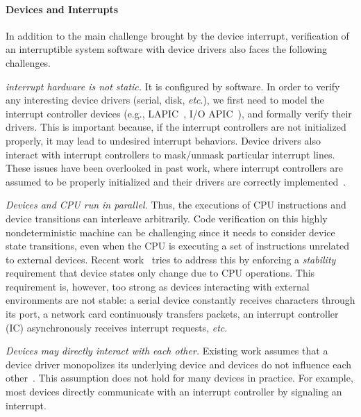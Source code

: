 \paragraph{Devices and Interrupts}

In addition to the main challenge brought by the device interrupt,
verification of an interruptible system software with device
drivers also faces the following challenges.

{\em interrupt hardware is not static.} It is configured by
software. In order to verify any interesting device drivers (serial,
disk, {\it etc}.), we first need to model the interrupt controller
devices (e.g., LAPIC~\cite{mps97}, I/O APIC~\cite{ioapicd96}), and
formally verify their drivers. This is important because, if the
interrupt controllers are not initialized properly, it may lead to
undesired interrupt behaviors. Device drivers also interact with
interrupt controllers to mask/unmask particular interrupt lines.
These issues have been overlooked in past work, where 
interrupt controllers are assumed to be properly initialized and
their drivers are correctly implemented~\cite{Alkassar:VSTTE08-225}.

{\em Devices and CPU run in parallel.} Thus, the executions of CPU
instructions and device transitions can interleave arbitrarily. Code
verification on this highly nondeterministic machine can be
challenging since it needs to consider device state transitions, even
when the CPU is executing a set of instructions unrelated to external
devices. Recent
work~\cite{Alkassar:OSVE09,Alkassar:VSTTE08-225,Alkassar:VSTTE2010-71}
tries to address this by enforcing a {\it stability} requirement
that device states only change due to CPU operations. 
%
%
This requirement is, however, 
too strong as devices interacting with 
external environments are not stable: a serial device constantly
receives characters through its port, a network card continuously
transfers packets, an interrupt controller (IC) asynchronously
receives interrupt requests, {\it etc}.

{\em Devices may directly interact with each other.} Existing work
assumes that a device driver monopolizes its underlying device and
devices do not influence each other~\cite{Alkassar:VSTTE08-225}. This
assumption does not hold for many devices in practice. For example,
most devices directly communicate with an interrupt controller by
signaling an interrupt.

